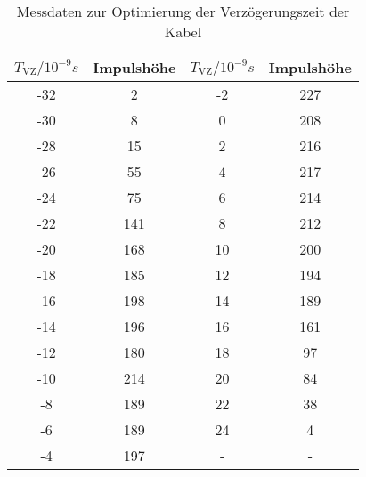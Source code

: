 \begin{table}[h!]
  \centering
  \caption{Messdaten zur Optimierung der Verzögerungszeit der Kabel}
  \label{tab:kalibrierung}
  \begin{tabular}{c c c c}
    \toprule
      $T_{\text{VZ}}/10^{-9}s$ & Impulshöhe & $T_{\text{VZ}}/10^{-9}s$ & Impulshöhe \\
      \midrule
      -32   &   2    &    -2    &   227  \\
      -30   &   8    &    0     &   208  \\
      -28   &   15   &    2     &   216  \\
      -26   &   55   &    4     &   217  \\
      -24   &   75   &    6     &   214  \\
      -22   &   141  &    8     &   212  \\
      -20   &   168  &    10    &   200  \\
      -18   &   185  &    12    &   194  \\
      -16   &   198  &    14    &   189  \\
      -14   &   196  &    16    &   161  \\
      -12   &   180  &    18    &   97   \\
      -10   &   214  &    20    &   84   \\
      -8    &   189  &    22    &   38   \\
      -6    &   189  &    24    &   4    \\
      -4    &   197  &     -    &    -   \\
    \bottomrule
  \end{tabular}
\end{table}

%
